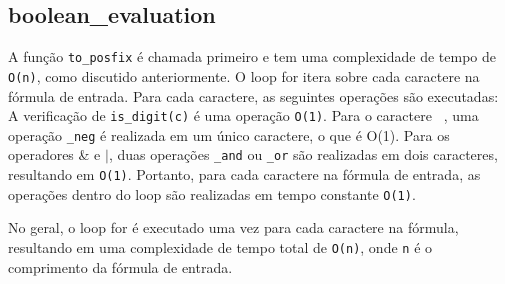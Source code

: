 \documentclass{article}
\begin{document}
\subsection{boolean\_evaluation}
A função \texttt{to\_posfix} é chamada primeiro e tem uma complexidade de tempo de \texttt{O(n)}, como discutido anteriormente.
O loop for itera sobre cada caractere na fórmula de entrada. Para cada caractere, as seguintes operações são executadas:
A verificação de \texttt{is\_digit(c)} é uma operação \texttt{O(1)}.
Para o caractere \texttt{~}, uma operação \texttt{\_neg} é realizada em um único caractere, o que é O(1).
Para os operadores \& e $|$, duas operações \texttt{\_and} ou \texttt{\_or} são realizadas em dois caracteres, resultando em \texttt{O(1)}.
Portanto, para cada caractere na fórmula de entrada, as operações dentro do loop são realizadas em tempo constante \texttt{O(1)}.

No geral, o loop for é executado uma vez para cada caractere na fórmula, resultando em uma complexidade de tempo total de \texttt{O(n)}, onde \texttt{n} é o comprimento da fórmula de entrada.
\end{document}
